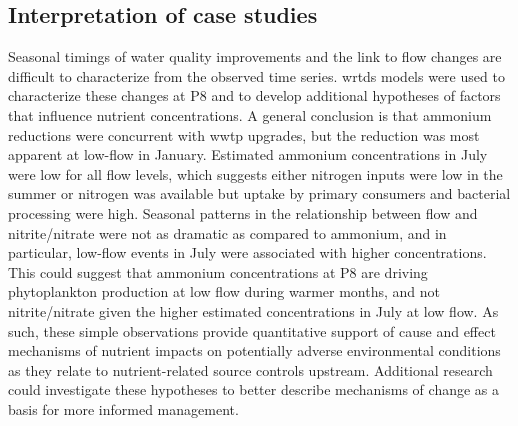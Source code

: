 \documentclass[letterpaper,12pt,oneside]{article}\usepackage[]{graphicx}\usepackage[]{color}
\begin{document}
\subsection{Interpretation of case studies}

Seasonal timings of water quality improvements and the link to flow changes are difficult to characterize from the observed time series. \ac{wrtds} models were used to characterize these changes at P8 and to develop additional hypotheses of factors that influence nutrient concentrations. A general conclusion is that ammonium reductions were concurrent with \ac{wwtp} upgrades, but the reduction was most apparent at low-flow in January. Estimated ammonium concentrations in July were low for all flow levels, which suggests either nitrogen inputs were low in the summer or nitrogen was available but uptake by primary consumers and bacterial processing were high. Seasonal patterns in the relationship between flow and nitrite/nitrate were not as dramatic as compared to ammonium, and in particular, low-flow events in July were associated with higher concentrations.  This could suggest that ammonium concentrations at P8 are driving phytoplankton production at low flow during warmer months, and not nitrite/nitrate given the higher estimated concentrations in July at low flow. As such, these simple observations provide quantitative support of cause and effect mechanisms of nutrient impacts on potentially adverse environmental conditions as they relate to nutrient-related source controls upstream.  Additional research could investigate these hypotheses to better describe mechanisms of change as a basis for more informed management.
\end{document}
